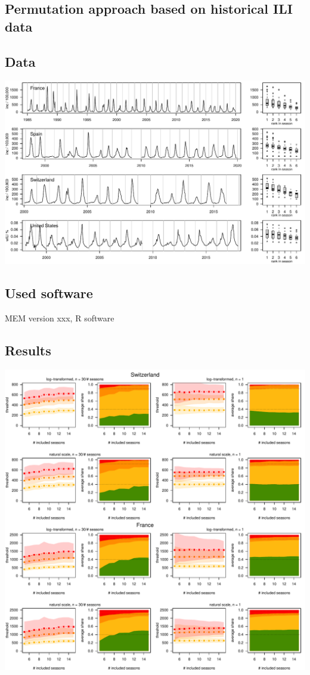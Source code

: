 \documentclass{article}
\begin{document}
\subsection{Permutation approach based on historical ILI data}

\subsection{Data}

\includegraphics{figure/plot_data.pdf}

\subsection{Used software}

MEM version xxx, R software

\subsection{Results}

\includegraphics[page=1]{figure/plot_results.pdf}
\end{document}
